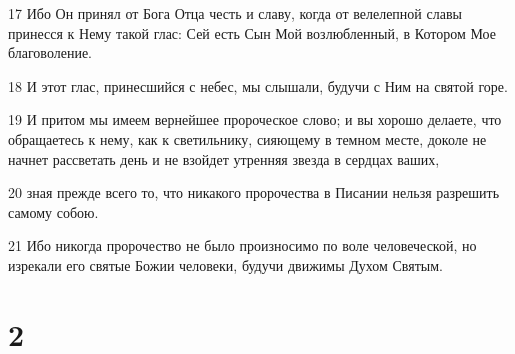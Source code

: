\par 17 Ибо Он принял от Бога Отца честь и славу, когда от велелепной славы принесся к Нему такой глас: Сей есть Сын Мой возлюбленный, в Котором Мое благоволение.
\par 18 И этот глас, принесшийся с небес, мы слышали, будучи с Ним на святой горе.
\par 19 И притом мы имеем вернейшее пророческое слово; и вы хорошо делаете, что обращаетесь к нему, как к светильнику, сияющему в темном месте, доколе не начнет рассветать день и не взойдет утренняя звезда в сердцах ваших,
\par 20 зная прежде всего то, что никакого пророчества в Писании нельзя разрешить самому собою.
\par 21 Ибо никогда пророчество не было произносимо по воле человеческой, но изрекали его святые Божии человеки, будучи движимы Духом Святым.

\chapter{2}


